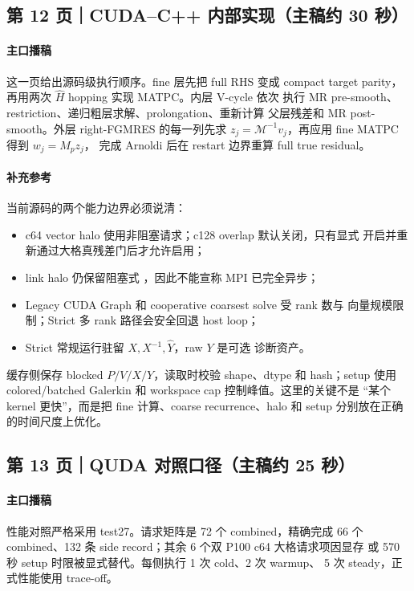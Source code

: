 \documentclass[UTF8,a4paper,11pt,fontset=none]{ctexart}
\newcommand{\code}[1]{\texttt{\detokenize{#1}}}
\begin{document}
\subsection{第 12 页｜CUDA--C++ 内部实现（主稿约 30 秒）}

\paragraph{主口播稿}
这一页给出源码级执行顺序。fine 层先把 full RHS 变成 compact target
parity，再用两次 \(\widehat H\) hopping 实现 MATPC。内层 V-cycle 依次
执行 MR pre-smooth、restriction、递归粗层求解、prolongation、重新计算
父层残差和 MR post-smooth。外层 right-FGMRES 的每一列先求
\(z_j=\mathcal M^{-1}v_j\)，再应用 fine MATPC 得到 \(w_j=M_pz_j\)，
完成 Arnoldi 后在 restart 边界重算 full true residual。

\paragraph{补充参考}
当前源码的两个能力边界必须说清：
\begin{itemize}
  \item c64 vector halo 使用非阻塞请求；c128 overlap 默认关闭，只有显式
        开启并重新通过大格真残差门后才允许启用；
  \item link halo 仍保留阻塞式 \code{Sendrecv}，因此不能宣称 MPI
        已完全异步；
  \item Legacy CUDA Graph 和 cooperative coarsest solve 受 rank 数与
        向量规模限制；Strict 多 rank 路径会安全回退 host loop；
  \item Strict 常规运行驻留 \(X,X^{-1},\widehat Y\)，raw \(Y\) 是可选
        诊断资产。
\end{itemize}
缓存侧保存 blocked \(P/V/X/Y\)，读取时校验 shape、dtype 和 hash；setup
使用 colored/batched Galerkin 和 workspace cap 控制峰值。这里的关键不是
“某个 kernel 更快”，而是把 fine 计算、coarse recurrence、halo 和 setup
分别放在正确的时间尺度上优化。

\subsection{第 13 页｜QUDA 对照口径（主稿约 25 秒）}

\paragraph{主口播稿}
性能对照严格采用 test27。请求矩阵是 72 个 combined，精确完成 66 个
combined、132 条 side record；其余 6 个双 P100 c64 大格请求项因显存
或 570 秒 setup 时限被显式替代。每侧执行 1 次 cold、2 次 warmup、
5 次 steady，正式性能使用 trace-off。
\end{document}
